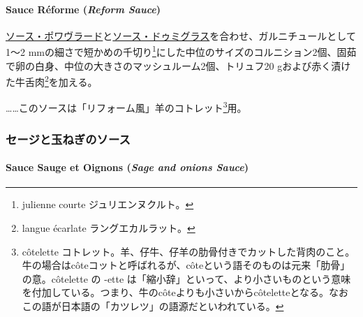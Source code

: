 \begin{recette}
\hypertarget{reform-sauce}{%
\paragraph{\texorpdfstring{Sauce Réforme (\emph{Reform
Sauce})}{Sauce Réforme (Reform Sauce)}}\label{reform-sauce}}


\protect\hyperlink{sauce-poivrade}{ソース・ポワヴラード}と\protect\hyperlink{sauce-demi-glace}{ソース・ドゥミグラス}を合わせ、ガルニチュールとして1〜2
mmの細さで短かめの千切り\footnote{julienne courte ジュリエンヌクルト。}にした中位のサイズのコルニション2個、固茹で卵の白身、中位の大きさのマッシュルーム2個、トリュフ20
gおよび赤く漬けた牛舌肉\footnote{langue écarlate ラングエカルラット。}を加える。

\ldots{}\ldots{}このソースは「リフォーム風」羊のコトレット\footnote{côtelette
  コトレット。羊、仔牛、仔羊の肋骨付きでカットした背肉のこと。牛の場合はcôteコットと呼ばれるが、côteという語そのものは元来「肋骨」の意。côtelette
  の -ette
  は「縮小辞」といって、より小さいものという意味を付加している。つまり、牛のcôteよりも小さいからcôteletteとなる。なおこの語が日本語の「カツレツ」の語源だといわれている。}用。

\maeaki

\hypertarget{ux30bbux30fcux30b8ux3068ux7389ux306dux304eux306eux30bdux30fcux30b9}{%
\subsubsection{セージと玉ねぎのソース}\label{ux30bbux30fcux30b8ux3068ux7389ux306dux304eux306eux30bdux30fcux30b9}}

\hypertarget{sage-and-onions-sauce}{%
\paragraph{\texorpdfstring{Sauce Sauge et Oignons (\emph{Sage and onions
Sauce})}{Sauce Sauge et Oignons (Sage and onions Sauce)}}\label{sage-and-onions-sauce}}


\end{recette}

